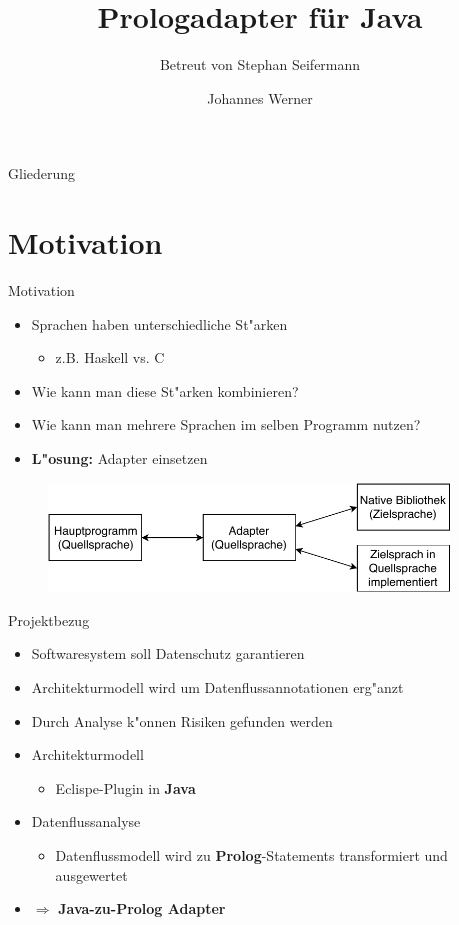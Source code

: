 \documentclass[18pt]{beamer}
\title[Prologadapter für Java]{Prologadapter für Java}
\subtitle{Betreut von Stephan Seifermann}
\author{Johannes Werner}
\institute{Fakultaet für Informatik}
\begin{document}

\begin{frame}
\titlepage
\end{frame}

\begin{frame}{Gliederung}
\tableofcontents
\end{frame}

\section{Motivation}
\begin{frame}{Motivation}
\begin{itemize}
\item Sprachen haben unterschiedliche St"arken
\begin{itemize}
\item z.B. Haskell vs. C
\end{itemize}
\item Wie kann man diese St"arken kombinieren?
\item Wie kann man mehrere Sprachen im selben Programm nutzen?
\item \textbf{L"osung:} Adapter einsetzen
\end{itemize}
\begin{figure}[h]
\centering
\includegraphics[width=0.95\textwidth]{adapter.pdf}
\end{figure}
\end{frame}
\begin{frame}{Projektbezug}
\begin{itemize}
\item Softwaresystem soll Datenschutz garantieren
\item Architekturmodell wird um Datenflussannotationen erg"anzt
\item Durch Analyse k"onnen Risiken gefunden werden
\vspace{1cm}
\item Architekturmodell
\begin{itemize}
\item Eclispe-Plugin in \textbf{Java}
\end{itemize}
\item Datenflussanalyse
\begin{itemize}
\item Datenflussmodell wird zu \textbf{Prolog}-Statements transformiert und ausgewertet
\end{itemize}
\item $\Rightarrow$ \textbf{Java-zu-Prolog Adapter}
\end{itemize}
\end{frame}
\end{document}
